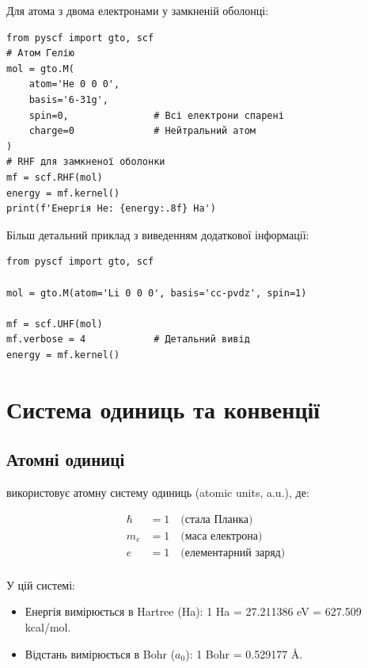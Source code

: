 Для атома з двома електронами у замкненій оболонці:

\begin{verbatim}
from pyscf import gto, scf
# Атом Гелію
mol = gto.M(
    atom='He 0 0 0',
    basis='6-31g',
    spin=0,               # Всі електрони спарені
    charge=0              # Нейтральний атом
)
# RHF для замкненої оболонки
mf = scf.RHF(mol)
energy = mf.kernel()
print(f'Енергія He: {energy:.8f} Ha')
\end{verbatim}

Більш детальний приклад з виведенням додаткової інформації:

\begin{verbatim}
from pyscf import gto, scf

mol = gto.M(atom='Li 0 0 0', basis='cc-pvdz', spin=1)

mf = scf.UHF(mol)
mf.verbose = 4            # Детальний вивід
energy = mf.kernel()
\end{verbatim}

\section{Система одиниць та конвенції}

\subsection{Атомні одиниці}

\PySCF{} використовує атомну систему одиниць (atomic units, a.u.), де:

\begin{align*}
\hbar &= 1  \quad \text{(стала Планка)} \\
m_e &= 1 \quad \text{(маса електрона)} \\
e &= 1 \quad \text{(елементарний заряд)} \\
\end{align*}

У цій системі:
\begin{itemize}
    \item Енергія вимірюється в Hartree (Ha): 1 Ha = 27.211386 eV = 627.509 kcal/mol.
    \item Відстань вимірюється в Bohr ($a_0$): 1 Bohr = 0.529177 \AA.
\end{itemize}

